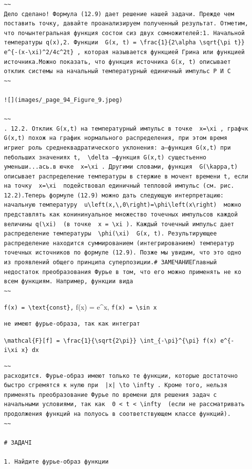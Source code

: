 \documentclass[
  ukrainian,
]{article}
\begin{document}
\begin{verbatim}
~~
Дело сделано! Формула (12.9) дает решение нашей задачи. Прежде чем поставить точку, давайте проанализируем полученный результат. Отметим, что почынтегральная функция состои сиз двух сомножителей:1. Начальной температуры q(x),2. Функции  G(x, t) = \frac{1}{2\alpha \sqrt{\pi t}} e^{-(x-\xi)^2/4c^2t} , которая называется функцией Грина или функцией источника.Можно показать, что функция источника G(x, t) описывает отклик системы на начальный температурный единичный импульс Р И С
~~

![](images/_page_94_Figure_9.jpeg)

~~
. 12.2. Отклик G(x,t) на температурный импульс в точке  x=\xi , графчк G(x,t) похож на график нормального распределения, при этом время игриег роль среднеквадратического уклонения: a—функция G(x,t) при пебольших значениях t,  \delta —функция G(x,t) сущестьенно уменьши...ась.в ючке  x=\xi . Другими словами, функция  G(\kappa,t)  описывает распределение температуры в стержие в мочент времени t, если на точку  x=\xi  подействовал единичный тепловой импульс (см. рис. 12.2).Теперь формуле (12.9) можно дать следующую интерпретацию: начальную температуру  u\left(x,\,0\right)=\phi\left(x\right)  можно представлять как конининуальное множество точечных импульсов каждой величины q(\xi)  (в точке  x = \xi ). Каждый точечный импульс дает распределение температуры  \phi(\xi)  G(x, t). Результирующее распределение находится суммированием (интегрированием) температур точечных источников по формуле (12.9). Позже мы увидим, что это одно из проявлений общего принципа суперпозиции.# ЗАМЕЧАНИЕГлавный недостаток преобразования Фурье в том, что его можно применять не ко всем функциям. Например, функции вида
~~
\end{verbatim}

\texttt{f(x)\ =\ \textbackslash{}text\{const\},} f(x) = e\^{}x,
\texttt{f(x)\ =\ \textbackslash{}sin\ x}

\begin{verbatim}
не имеют фурье-образа, так как интеграт
\end{verbatim}

\texttt{\textbackslash{}mathcal\{F\}{[}f{]}\ =\ \textbackslash{}frac\{1\}\{\textbackslash{}sqrt\{2\textbackslash{}pi\}\}\ \textbackslash{}int\_\{-\textbackslash{}pi\}\^{}\{\textbackslash{}pi\}\ f(x)\ e\^{}\{-i\textbackslash{}xi\ x\}\ dx}

\begin{verbatim}
~~
расходится. Фурье-образ имеют только те функции, которые достаточно быстро сгремятся к нулю при  |x| \to \infty . Кроме того, нельзя применять преобразование Фурье по времени для решения задач с начальными условиями, так как  0 < t < \infty  (если не рассматривать продолжения функций на полуось в соответствующем классе функций).
~~

# ЗАДАЧІ

1. Найдите фурье-образ функции
\end{verbatim}
\end{document}
